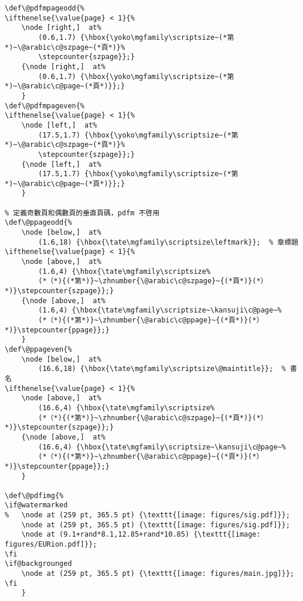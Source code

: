 \begin{lstlisting}[firstnumber=417]
% 定義奇數頁和偶數頁的水平頁碼，pdfm 啓用
\def\@pdfmpageodd{%
\ifthenelse{\value{page} < 1}{%
	\node [right,]  at%
		(0.6,1.7) {\hbox{\yoko\mgfamily\scriptsize~(*第*)~\@arabic\c@szpage~(*頁*)}%
		\stepcounter{szpage}};}
	{\node [right,]  at%
		(0.6,1.7) {\hbox{\yoko\mgfamily\scriptsize~(*第*)~\@arabic\c@page~(*頁*)}};}
	}
\def\@pdfmpageven{%
\ifthenelse{\value{page} < 1}{%
	\node [left,]  at%
		(17.5,1.7) {\hbox{\yoko\mgfamily\scriptsize~(*第*)~\@arabic\c@szpage~(*頁*)}%
		\stepcounter{szpage}};}
	{\node [left,]  at%
		(17.5,1.7) {\hbox{\yoko\mgfamily\scriptsize~(*第*)~\@arabic\c@page~(*頁*)}};}
	}

% 定義奇數頁和偶數頁的垂直頁碼，pdfm 不啓用
\def\@ppageodd{%
	\node [below,]  at%
		(1.6,18) {\hbox{\tate\mgfamily\scriptsize\leftmark}};  % 章標題
\ifthenelse{\value{page} < 1}{%
	\node [above,]  at%
		(1.6,4) {\hbox{\tate\mgfamily\scriptsize%
		(*（*){(*第*)}~\zhnumber{\@arabic\c@szpage}~{(*頁*)}(*）*)}\stepcounter{szpage}};}
	{\node [above,]  at%
		(1.6,4) {\hbox{\tate\mgfamily\scriptsize~\kansuji\c@page~%
		(*（*){(*第*)}~\zhnumber{\@arabic\c@ppage}~{(*頁*)}(*）*)}\stepcounter{ppage}};}
	}
\def\@ppageven{%
	\node [below,]  at%
		(16.6,18) {\hbox{\tate\mgfamily\scriptsize\@maintitle}};  % 書名
\ifthenelse{\value{page} < 1}{%
	\node [above,]  at%
		(16.6,4) {\hbox{\tate\mgfamily\scriptsize%
		(*（*){(*第*)}~\zhnumber{\@arabic\c@szpage}~{(*頁*)}(*）*)}\stepcounter{szpage}};}
	{\node [above,]  at%
		(16.6,4) {\hbox{\tate\mgfamily\scriptsize~\kansuji\c@page~%
		(*（*){(*第*)}~\zhnumber{\@arabic\c@ppage}~{(*頁*)}(*）*)}\stepcounter{ppage}};}
	}

\def\@pdfimg{%
\if@watermarked
%	\node at (259 pt, 365.5 pt) {\texttt{[image: figures/sig.pdf]}};
	\node at (259 pt, 365.5 pt) {\texttt{[image: figures/sig.pdf]}};
	\node at (9.1+rand*8.1,12.85+rand*10.85) {\texttt{[image: figures/EURion.pdf]}};
\fi
\if@backgrounged
	\node at (259 pt, 365.5 pt) {\texttt{[image: figures/main.jpg]}};
\fi
	}
\end{lstlisting}

